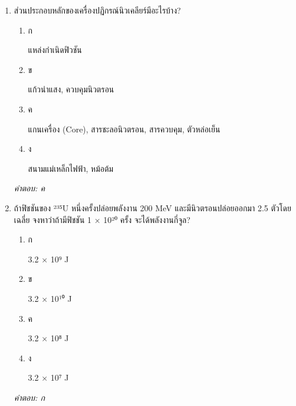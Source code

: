 \documentclass[12pt]{article}
\begin{document}
\begin{enumerate}[label=\arabic*., itemsep=0.5\baselineskip, topsep=0.5\baselineskip, leftmargin=*]
\item ส่วนประกอบหลักของเครื่องปฏิกรณ์นิวเคลียร์มีอะไรบ้าง?
\begin{enumerate}[label=\alph*)., itemsep=0.3\baselineskip, topsep=0.3\baselineskip]
\item ก\ 
\begin{minipage}[t]{0.9\linewidth}
\raggedright แหล่งกำเนิดฟิวชัน
\end{minipage}
\item ข\ 
\begin{minipage}[t]{0.9\linewidth}
\raggedright แก้วนำแสง, ควบคุมนิวตรอน
\end{minipage}
\item ค\ 
\begin{minipage}[t]{0.9\linewidth}
\raggedright แกนเครื่อง (Core), สารชะลอนิวตรอน, สารควบคุม, ตัวหล่อเย็น
\end{minipage}
\item ง\ 
\begin{minipage}[t]{0.9\linewidth}
\raggedright สนามแม่เหล็กไฟฟ้า, หม้อต้ม
\end{minipage}
\end{enumerate}
\vspace{-0.3\baselineskip}
\begin{small}
\textit{คำตอบ: ค}
\end{small}

\item ถ้าฟิชชันของ ²³⁵U หนึ่งครั้งปล่อยพลังงาน 200 MeV และมีนิวตรอนปล่อยออกมา 2.5 ตัวโดยเฉลี่ย จงหาว่าถ้ามีฟิชชัน 1 × 10²⁰ ครั้ง จะได้พลังงานกี่จูล?
\begin{enumerate}[label=\alph*)., itemsep=0.3\baselineskip, topsep=0.3\baselineskip]
\item ก\ 
\begin{minipage}[t]{0.9\linewidth}
\raggedright 3.2 × 10⁹ J
\end{minipage}
\item ข\ 
\begin{minipage}[t]{0.9\linewidth}
\raggedright 3.2 × 10¹⁰ J
\end{minipage}
\item ค\ 
\begin{minipage}[t]{0.9\linewidth}
\raggedright 3.2 × 10⁸ J
\end{minipage}
\item ง\ 
\begin{minipage}[t]{0.9\linewidth}
\raggedright 3.2 × 10⁷ J
\end{minipage}
\end{enumerate}
\vspace{-0.3\baselineskip}
\begin{small}
\textit{คำตอบ: ก}
\end{small}


\end{enumerate}
\end{document}
